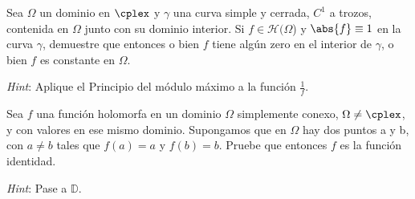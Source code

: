 \begin{problem}
Sea $\Omega$ un dominio en $\cplex$ y $\gamma$ una curva simple y cerrada, $C^1$ a trozos, contenida en $\Omega$ junto con su dominio interior. Si $f \in \mathcal{H}(\Omega$) y $\abs{f} \equiv 1$ en la curva $\gamma$, demuestre que entonces o bien $f$ tiene algún zero en el interior de $\gamma$, o bien $f$ es constante en $\Omega$.

{\it Hint}: Aplique el Principio del módulo máximo a la función $\frac{1}{f}$.

\solution

\end{problem}

\begin{problem}
Sea $f$ una función holomorfa en un dominio $\Omega$ simplemente conexo, $\Omega \neq \cplex$, y con valores en ese mismo dominio. Supongamos que en $\Omega$ hay dos puntos a y b, con $a \neq b$ tales que $f(a) = a$ y $f(b) = b$. Pruebe que entonces $f$ es la función identidad.

{\it Hint}: Pase a $\mathbb{D}$.
\solution


\end{problem}

